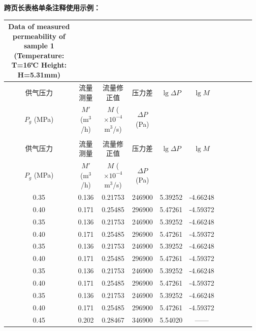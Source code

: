 \textbf{跨页长表格单条注释使用示例：}
\begin{longtable}{C{0.15} C{0.15} C{0.25} C{0.15} C{0.15} C{0.15}}
{Data of measured permeability of sample 1 (Temperature: T=16℃ Height: H=5.31mm)} %
\label{tab:permeability} \\ %

\toprule[1.5pt]
供气压力 & 流量测量 & 流量修正值 & 压力差 & $\lg \Delta P$ & $\lg M$ \\ 
$P_g$ (MPa) & $M'$ (m$^3$/h) & $M$ ($\times10^{-4}$ m$^3$/s) & $\Delta P$ (Pa) & & \\  %
\midrule[1pt]
\endfirsthead

 \\ %
\toprule[1.5pt]
供气压力 & 流量测量 & 流量修正值 & 压力差 & $\lg \Delta P$ & $\lg M$ \\ 
$P_g$ (MPa) & $M'$ (m$^3$/h) & $M$ ($\times10^{-4}$ m$^3$/s) & $\Delta P$ (Pa) & & \\ %
\midrule[1pt]
\endhead

\midrule[1.5pt]
\endfoot

\bottomrule[1.5pt]    %
\endlastfoot   %

0.35 & 0.136 & 0.21753 & 246900 & 5.39252 & -4.66248 \\  
0.40 & 0.171 & 0.25485 & 296900 & 5.47261 & -4.59372 \\
0.35 & 0.136 & 0.21753 & 246900 & 5.39252 & -4.66248 \\
0.40 & 0.171 & 0.25485 & 296900 & 5.47261 & -4.59372 \\
0.35 & 0.136 & 0.21753 & 246900 & 5.39252 & -4.66248 \\
0.40 & 0.171 & 0.25485 & 296900 & 5.47261 & -4.59372 \\
0.35 & 0.136 & 0.21753 & 246900 & 5.39252 & -4.66248 \\
0.40 & 0.171 & 0.25485 & 296900 & 5.47261 & -4.59372 \\
0.35 & 0.136 & 0.21753 & 246900 & 5.39252 & -4.66248 \\
0.40 & 0.171 & 0.25485 & 296900 & 5.47261 & -4.59372 \\
0.45 & 0.202 & 0.28467 & 346900 & 5.54020 & —— 
\end{longtable}


